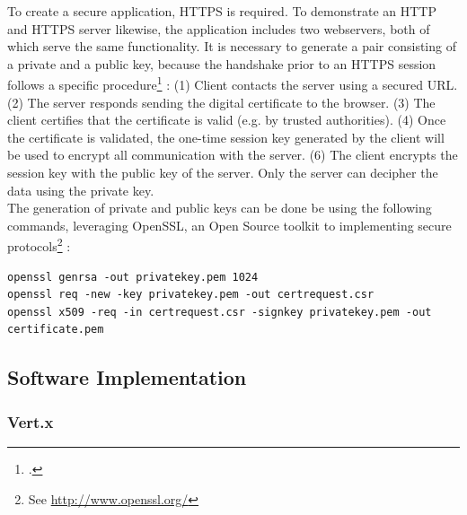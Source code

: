 To create a secure application, HTTPS is required. To demonstrate an HTTP and
HTTPS server likewise, the application includes two webservers, both of which
serve the same functionality. It is necessary to generate a pair consisting of a
private and a public key, because the handshake prior to an HTTPS session
follows a specific procedure\footcite[Cf.]{Nemati_2011} :
 (1) Client contacts the server using a secured URL.
 (2) The server responds sending the digital certificate to the browser.
 (3) The client certifies that the certificate is valid (e.g. by trusted
 authorities).
 (4) Once the certificate is validated, the one-time session key generated by
 the client will be used to encrypt all communication with the server.
 (6) The client encrypts the session key with the public key of the server. Only
 the server can decipher the data using the private key.\\
The generation of private and public keys can be done be using the following
commands, leveraging OpenSSL, an Open Source toolkit to implementing secure
protocols\footnote{See \url{ http://www.openssl.org/}} :\\

\begin{lstlisting}[caption={Generating a new pair of public/private keys}]
openssl genrsa -out privatekey.pem 1024
openssl req -new -key privatekey.pem -out certrequest.csr 
openssl x509 -req -in certrequest.csr -signkey privatekey.pem -out certificate.pem
\end{lstlisting}


\FloatBarrier
\subsection{Software Implementation}
\label{software_implementation}

\subsubsection{Vert.x}
\label{implementation_vertx}


